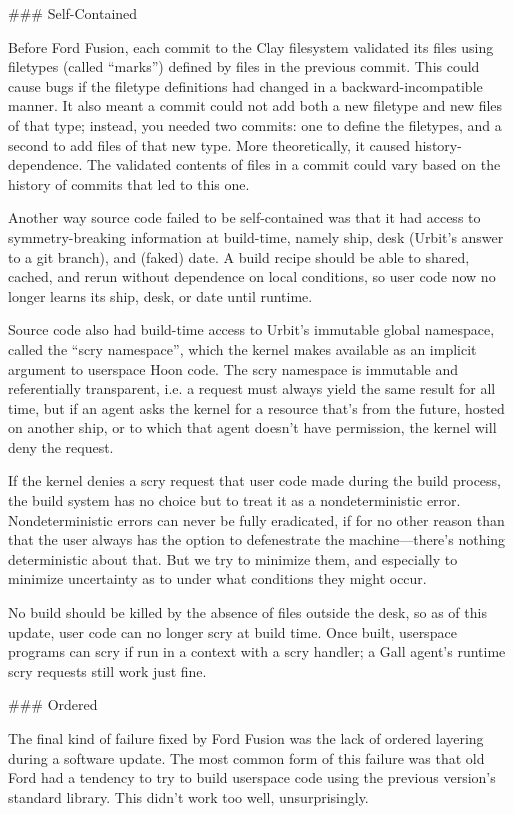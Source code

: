 \documentclass[twoside]{article}
\begin{document}
### Self-Contained

Before Ford Fusion, each commit to the Clay filesystem validated its files using filetypes (called “marks”) defined by files in the previous commit. This could cause bugs if the filetype definitions had changed in a backward-incompatible manner. It also meant a commit could not add both a new filetype and new files of that type; instead, you needed two commits: one to define the filetypes, and a second to add files of that new type. More theoretically, it caused history-dependence. The validated contents of files in a commit could vary based on the history of commits that led to this one.

Another way source code failed to be self-contained was that it had access to symmetry-breaking information at build-time, namely ship, desk (Urbit's answer to a git branch), and (faked) date. A build recipe should be able to shared, cached, and rerun without dependence on local conditions, so user code now no longer learns its ship, desk, or date until runtime.

Source code also had build-time access to Urbit's immutable global namespace, called the “scry namespace”, which the kernel makes available as an implicit argument to userspace Hoon code. The scry namespace is immutable and referentially transparent, i.e. a request must always yield the same result for all time, but if an agent asks the kernel for a resource that’s from the future, hosted on another ship, or to which that agent doesn’t have permission, the kernel will deny the request.

If the kernel denies a scry request that user code made during the build process, the build system has no choice but to treat it as a nondeterministic error. Nondeterministic errors can never be fully eradicated, if for no other reason than that the user always has the option to defenestrate the machine—there's nothing deterministic about that. But we try to minimize them, and especially to minimize uncertainty as to under what conditions they might occur.

No build should be killed by the absence of files outside the desk, so as of this update, user code can no longer scry at build time. Once built, userspace programs can scry if run in a context with a scry handler; a Gall agent's runtime scry requests still work just fine.

### Ordered

The final kind of failure fixed by Ford Fusion was the lack of ordered layering during a software update. The most common form of this failure was that old Ford had a tendency to try to build userspace code using the previous version's standard library. This didn't work too well, unsurprisingly.
\end{document}

